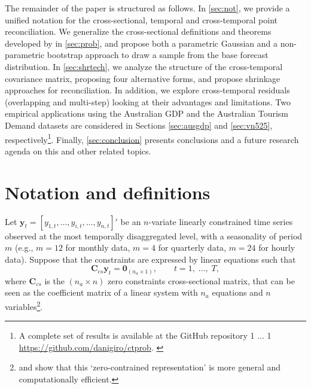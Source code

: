 \documentclass[a4paper,11pt]{article}
\newcommand{\blind}{1}
\newcommand{\yvet}{\bm{y}}
\newcommand{\Cvet}{\bm{C}}
\newcommand{\Zerovet}{\bm{0}}
\newcommand{\githuburl}{\begingroup%
\if0\blind
{
$\dots$
}\fi
\if1\blind
{
\url{https://github.com/danigiro/ctprob}.
}\fi
\endgroup}
\theoremstyle{definition}
\begin{document}
The remainder of the paper is structured as follows. In \autoref{sec:not}, we provide a unified notation for the cross-sectional, temporal and cross-temporal point reconciliation. We generalize the cross-sectional definitions and theorems developed by \cite{panagiotelis2023} in \autoref{sec:prob}, and propose both a parametric Gaussian and a non-parametric bootstrap approach to draw a sample from the base forecast distribution. In \autoref{sec:shrtech}, we analyze the structure of the cross-temporal covariance matrix, proposing four alternative forms, and propose shrinkage approaches for reconciliation. In addition, we explore cross-temporal residuals (overlapping and multi-step) looking at their advantages and limitations. %
Two empirical applications using the Australian GDP and the Australian Tourism Demand datasets are considered in Sections \ref{sec:ausgdp} and \ref{sec:vn525}, respectively\footnote{A complete set of results is available at the GitHub repository \githuburl}. Finally, \autoref{sec:conclusion} presents conclusions and a future research agenda on this and other related topics.


\section{Notation and definitions}\label{sec:not}

Let $\yvet_t = [y_{1,t},\dots,y_{i,t},\dots,y_{n,t}]'$ be an $n$-variate linearly constrained time series observed at the most temporally disaggregated level, with a seasonality of period $m$ (e.g., $m = 12$ for monthly data, $m = 4$ for quarterly data, $m = 24$ for hourly data). Suppose that the constraints are expressed by linear equations such that \citep{difonzo2023}
\begin{equation}
	\label{eq:cs_con}
	\Cvet_{cs}\yvet_t = \Zerovet_{(n_a \times 1)}, \qquad t = 1, \;\dots, \;T,
\end{equation}
where $\Cvet_{cs}$ is the $(n_a \times n)$ zero constraints cross-sectional matrix, that can be seen as the coefficient matrix of a linear system with $n_a$ equations and $n$ variables\footnote{\cite{blogH2022} and \cite{giro2022} show that this ‘zero-contrained representation' is more general and computationally efficient.}.


\end{document}
